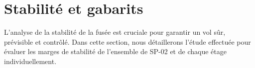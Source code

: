 \section{Stabilité et gabarits}
\label{sec:stabilite}

L'analyse de la stabilité de la fusée est cruciale pour garantir un vol sûr, prévisible et contrôlé. Dans cette section, nous
détaillerons l'étude effectuée pour évaluer les marges de stabilité de l'ensemble de SP-02 et de chaque étage individuellement.





\newpage